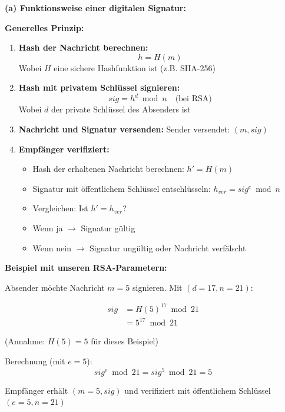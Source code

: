 \documentclass[12pt,a4paper]{article}
\begin{document}
\begin{tcolorbox}[colback=solutionbg, colframe=black!30]

\textbf{(a) Funktionsweise einer digitalen Signatur:} \checkmark

\textbf{Generelles Prinzip:}

\begin{enumerate}
    \item \textbf{Hash der Nachricht berechnen:}
    $$h = H(m)$$
    Wobei $H$ eine sichere Hashfunktion ist (z.B. SHA-256)
    
    \item \textbf{Hash mit privatem Schlüssel signieren:}
    $$sig = h^d \bmod n \quad \text{(bei RSA)}$$
    Wobei $d$ der private Schlüssel des Absenders ist
    
    \item \textbf{Nachricht und Signatur versenden:}
    Sender versendet: $(m, sig)$
    
    \item \textbf{Empfänger verifiziert:}
    \begin{itemize}
        \item Hash der erhaltenen Nachricht berechnen: $h' = H(m)$
        \item Signatur mit öffentlichem Schlüssel entschlüsseln: $h_{ver} = sig^e \bmod n$
        \item Vergleichen: Ist $h' = h_{ver}$?
        \item Wenn ja $\to$ Signatur gültig
        \item Wenn nein $\to$ Signatur ungültig oder Nachricht verfälscht
    \end{itemize}
\end{enumerate}

\textbf{Beispiel mit unseren RSA-Parametern:}

Absender möchte Nachricht $m = 5$ signieren. Mit $(d=17, n=21)$:

\begin{align*}
sig &= H(5)^{17} \bmod 21 \\
    &= 5^{17} \bmod 21
\end{align*}

(Annahme: $H(5) = 5$ für dieses Beispiel)

Berechnung (mit $e=5$):
$$sig^e \bmod 21 = sig^5 \bmod 21 = 5$$

Empfänger erhält $(m=5, sig)$ und verifiziert mit öffentlichem Schlüssel $(e=5, n=21)$

\end{tcolorbox}
\end{document}
